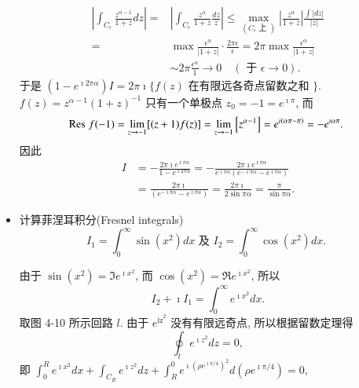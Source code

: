 \begin{itemize}
$$
\begin{aligned}
\left|\int_{C_{\epsilon}} \frac{z^{\alpha-1}}{1+z} d z\right|= & \left|\int_{C_{\epsilon}} \frac{z^\alpha}{1+z} \frac{d z}{z}\right| \leqslant \max _{\left(C_{\epsilon} \text { 上 }\right)}\left|\frac{z^\alpha}{1+z}\right| \frac{\int|d z|}{|z|} \\
= & \max \frac{\epsilon^\alpha}{|1+z|} \cdot \frac{2 \pi \epsilon}{\epsilon}=2 \pi \max \frac{\epsilon^\alpha}{|1+z|} \\
& \sim 2 \pi \frac{\epsilon^\alpha}{1} \rightarrow 0 \quad(\text { 于 } \epsilon \rightarrow 0) .
\end{aligned}
$$
于是 $\left(1-e^{\imath 2 \pi \alpha}\right) I=2 \pi \imath\{f(z)$ 在有限远各奇点留数之和 $\}$.
$f(z)=z^{\alpha-1}(1+z)^{-1}$ 只有一个单极点 $z_0=-1=e^{\imath \pi}$, 而
$$
{\mathrm{Res}\;} f(-1)=\lim _{z \rightarrow-1}[(z+1) f(z)]=\lim _{z \rightarrow-1}\left[z^{\alpha-1}\right]=e^{\imath(\alpha \pi-\pi)}=-e^{\imath \alpha \pi} \text {. }
$$
因此
$$
\begin{aligned}
I & =-\frac{2 \pi \imath e^{\imath \pi \alpha}}{1-e^{\imath 2 \pi \alpha}}=-\frac{2 \pi \imath e^{\imath \pi \alpha}}{e^{\imath \pi \alpha}\left(e^{-\imath \pi \alpha}-e^{\imath \pi \alpha}\right)} \\
& =\frac{2 \pi \imath}{\left(e^{-\imath \pi \alpha}-e^{\imath \pi \alpha}\right)}=\frac{2 \pi \imath}{2 \sin \pi \alpha}=\frac{\pi}{\sin \pi \alpha} .
\end{aligned}
$$

    \item 计算菲涅耳积分(Fresnel integrals)
    $$
    I_1=\int_0^{\infty} \sin \left(x^2\right) d x \text { 及 } I_2=\int_0^{\infty} \cos \left(x^2\right) d x \text {. }
    $$

    由于 $\sin \left(x^2\right)=\Im e^{\imath x^2}$, 而 $\cos \left(x^2\right)=\Re e^{\imath x^2}$, 所以
$$
I_2+\imath I_1=\int_0^{\infty} e^{\imath x^2} d x .
$$
取图 4-10 所示回路 $l$. 由于 $e^{\mathrm{iz}^2}$ 没有有限远奇点, 所以根据留数定理得
$$
\oint_l e^{\imath z^2} d z=0,
$$
即 $\int_0^R e^{\imath x^2} d x+\int_{C_R} e^{\imath z^2} d z+\int_R^0 e^{\imath\left(\rho e^{\imath \pi / 4}\right)^2} d\left(\rho e^{\imath \pi / 4}\right)=0$,


\end{itemize}
